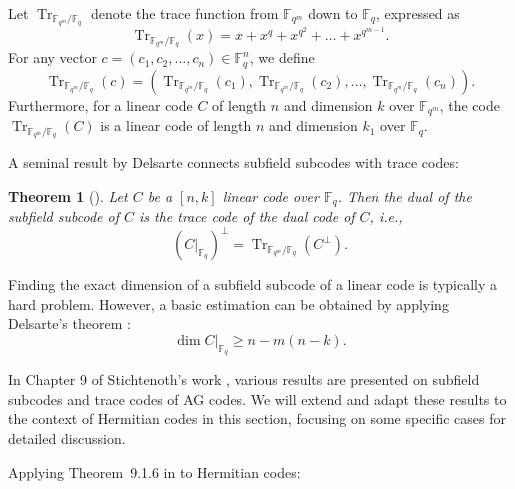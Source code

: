 \documentclass[a4paper]{amsart}
\theoremstyle{plain}
\newtheorem{theorem}{Theorem}[section]
\theoremstyle{definition}
\theoremstyle{remark}
\DeclareMathOperator{\trace}{Tr}
\newcommand{\fq}{\mathbb{F}_{q}}
\begin{document}
Let $\trace_{\mathbb{F}_{q^m} / \mathbb{F}_q}$ denote the trace function from $\mathbb{F}_{q^m}$ down to $\mathbb{F}_q$, expressed as
\[
	\trace_{\mathbb{F}_{q^m} / \mathbb{F}_q}(x) = x + x^q + x^{q^2} + \ldots + x^{q^{m-1}}.
\]
For any vector $c = (c_1, c_2, \ldots, c_n) \in \mathbb{F}_q^n$, we define
\[
	\trace_{\mathbb{F}_{q^m} / \mathbb{F}_q}(c) = \left( \trace_{\mathbb{F}_{q^m} / \mathbb{F}_q}(c_1), \trace_{\mathbb{F}_{q^m} / \mathbb{F}_q}(c_2), \ldots, \trace_{\mathbb{F}_{q^m} / \mathbb{F}_q}(c_n) \right).
\]
Furthermore, for a linear code $C$ of length $n$ and dimension $k$ over $\mathbb{F}_{q^m}$, the code $\trace_{\mathbb{F}_{q^m} / \mathbb{F}_q}(C)$ is a linear code of length $n$ and dimension $k_1$ over $\mathbb{F}_q$.

A seminal result by Delsarte connects subfield subcodes with trace codes:

\begin{theorem}[\cite{Del75}]\label{delsarte}
	Let $C$ be a $[n,k]$ linear code over $\mathbb{F}_q$. Then the dual of the subfield subcode of $C$ is the trace code of the dual code of $C$, i.e., 
	\[
		(C|_{\mathbb{F}_q})^{\perp} = \trace_{\mathbb{F}_{q^m} / \mathbb{F}_q}(C^{\perp}).
	\]
\end{theorem}
Finding the exact dimension of a subfield subcode of a linear code is typically a hard problem. However, a basic estimation can be obtained by applying Delsarte's theorem {\cite{Del75}}:
\begin{equation}
	\dim C|_{\fq} \geq n - m(n-k).
\end{equation}



In Chapter 9 of Stichtenoth's work \cite{stichtenoth2009algebraic}, various results are presented on subfield subcodes and trace codes of AG codes. We will extend and adapt these results to the context of Hermitian codes in this section, focusing on some specific cases for detailed discussion.



Applying  Theorem~9.1.6 in \cite{stichtenoth2009algebraic} to Hermitian codes:
\end{document}
